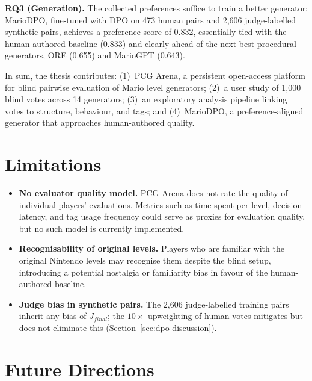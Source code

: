 \documentclass[shortabstract, mgr, english]{iithesis}
\begin{document}
\textbf{RQ3 (Generation).} The collected preferences suffice to train
a better generator: MarioDPO, fine-tuned with DPO on 473 human pairs and 2,606
judge-labelled synthetic pairs, achieves a preference score of 0.832,
essentially tied with the human-authored baseline (0.833) and clearly ahead of
the next-best procedural generators, ORE (0.655) and MarioGPT (0.643).


In sum, the thesis contributes: (1)~PCG Arena, a persistent
open-access platform for blind pairwise evaluation of Mario level generators;
(2)~a user study of 1,000 blind votes across 14 generators; (3)~an exploratory
analysis pipeline linking votes to structure, behaviour, and tags; and
(4)~MarioDPO, a preference-aligned generator that approaches human-authored
quality.

\section{Limitations}
\label{sec:conc-limitations}

\begin{itemize}
    \item \textbf{No evaluator quality model.} PCG Arena does not rate the
          quality of individual players' evaluations. Metrics such as time
          spent per level, decision latency, and tag usage frequency could
          serve as proxies for evaluation quality, but no such model is
          currently implemented.
    \item \textbf{Recognisability of original levels.} Players who are
          familiar with the original Nintendo levels may recognise them
          despite the blind setup, introducing a potential nostalgia or
          familiarity bias in favour of the human-authored baseline.
    \item \textbf{Judge bias in synthetic pairs.} The 2,606
          judge-labelled training pairs inherit any bias of $J_{final}$; the
          $10\times$ upweighting of human votes mitigates but does not
          eliminate this (Section~\ref{sec:dpo-discussion}).
\end{itemize}

\section{Future Directions}
\label{sec:conc-future}
\end{document}
